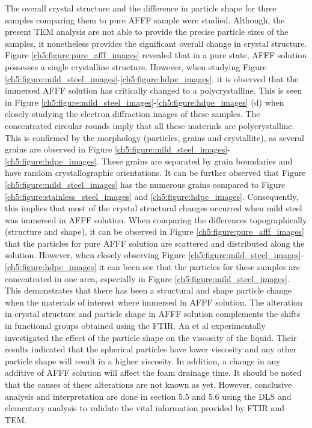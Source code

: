 The overall crystal structure and the difference in particle shape for three samples comparing them to pure AFFF sample were studied. Although, the present TEM analysis are not able to provide the precise particle sizes of the samples, it nonetheless provides the significant overall change in crystal structure. Figure \ref{ch5:figure:pure_afff_images} revealed that in a pure state, AFFF solution possesses a single crystalline structure. However, when studying Figure \ref{ch5:figure:mild_steel_images}-\ref{ch5:figure:hdpe_images}, it is observed that the immersed AFFF solution has critically changed to a polycrystalline. This is seen in Figure \ref{ch5:figure:mild_steel_images}-\ref{ch5:figure:hdpe_images} (d) when closely studying the electron diffraction images of these samples. The concentrated circular rounds imply that all these materials are polycrystalline. This is confirmed by the morphology (particles, grains and crystallite), as several grains are observed in Figure \ref{ch5:figure:mild_steel_images}-\ref{ch5:figure:hdpe_images}. These grains are separated by grain boundaries and have random crystallographic orientations. It can be further observed that Figure \ref{ch5:figure:mild_steel_images} has the numerous grains compared to Figure \ref{ch5:figure:stainless_steel_images} and \ref{ch5:figure:hdpe_images}.  Consequently, this implies that most of the crystal structural changes occurred when mild steel was immersed in AFFF solution. 
When comparing the differences topographically (structure and shape), it can be observed in Figure \ref{ch5:figure:pure_afff_images} that the particles for pure AFFF solution are scattered and distributed along the solution. However, when closely observing Figure \ref{ch5:figure:mild_steel_images}-\ref{ch5:figure:hdpe_images} it can been see that the particles for these samples are concentrated in one area, especially in Figure \ref{ch5:figure:mild_steel_images}. This demonstrates that there has been a structural and shape particle change when the materials of interest where immersed in AFFF solution. The alteration in crystal structure and particle shape in AFFF solution complements the shifts in functional groups obtained using the FTIR. An et al \cite{lin1991handbook} experimentally investigated the effect of the particle shape on the viscosity of the liquid. Their results indicated that the spherical particles have lower viscosity and any other particle shape will result in a higher viscosity. In addition, a change in any additive of AFFF solution will affect the foam drainage time. It should be noted that the causes of these alterations are not known as yet. However, conclusive analysis and interpretation are done in section 5.5 and 5.6 using the DLS and elementary analysis to validate the vital information provided by FTIR and TEM.

